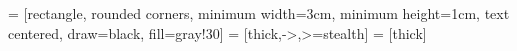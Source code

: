 
 = [rectangle, rounded corners, minimum width=3cm, minimum height=1cm, text centered, draw=black, fill=gray!30]
 = [thick,->,>=stealth]
 = [thick]



	
%		
%		
%		
%		

